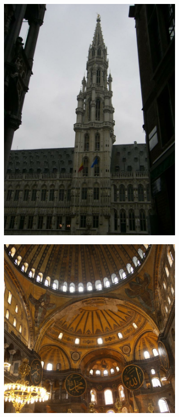 \begin{figure}
\begin{subfigure}{.5\textwidth}
		\includegraphics[width=.9\textwidth]{../graphics/grand_01352021_435013564.jpg}
	\end{subfigure}
	\begin{subfigure}{.5\textwidth}
		\centering
		\includegraphics[width=.9\textwidth]{../graphics/hagia_04240457_5644708528.jpg}

\end{subfigure}
\end{figure}
